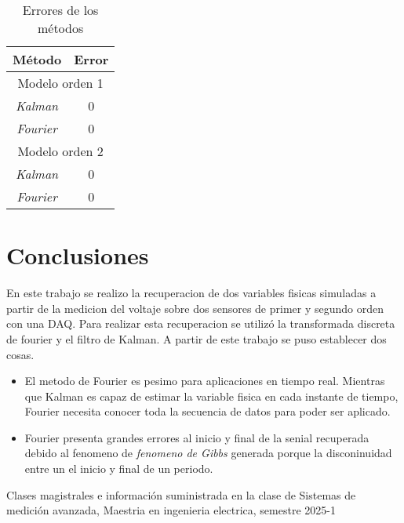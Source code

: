 \documentclass[conference]{IEEEtran}
\begin{document}
\begin{table}[h]
	\centering
	\caption{Errores de los m\'etodos}
	\label{tab:errores}
	\begin{tabular}{|c|c|}
		\hline
		
		\textbf{M\'etodo} & \textbf{Error} \\
		\hline
		\multicolumn{2}{|c|}{Modelo orden 1} \\
		\hline
		\textit{Kalman}  &  0 \\
		\textit{Fourier} & 0 \\
		\hline
		\multicolumn{2}{|c|}{Modelo orden 2} \\
		\hline
		\textit{Kalman}  &  0 \\
		\textit{Fourier} & 0 \\
		\hline
	\end{tabular}
	
\end{table}

\section{Conclusiones}

En este trabajo se realizo la recuperacion de dos variables fisicas simuladas a partir de la medicion del voltaje sobre dos sensores de primer y segundo orden con una DAQ. Para realizar esta recuperacion se utiliz\'o la transformada discreta de fourier y el filtro de Kalman. A partir de este trabajo se puso establecer dos cosas.

\begin{itemize}
	\item El metodo de Fourier es pesimo para aplicaciones en tiempo real. Mientras que Kalman es capaz de estimar la variable fisica en cada instante de tiempo, Fourier necesita conocer toda la secuencia de datos para poder ser aplicado.
	\item Fourier presenta grandes errores al inicio y final de la senial recuperada debido al fenomeno de \textit{fenomeno de Gibbs} generada porque la disconinuidad entre un el inicio y final de un periodo.
\end{itemize}

\begin{thebibliography}{00}

	\item Clases magistrales e información suministrada en la clase de Sistemas de medición avanzada, Maestria en ingenieria electrica, semestre 2025-1

\end{thebibliography}
\end{document}
